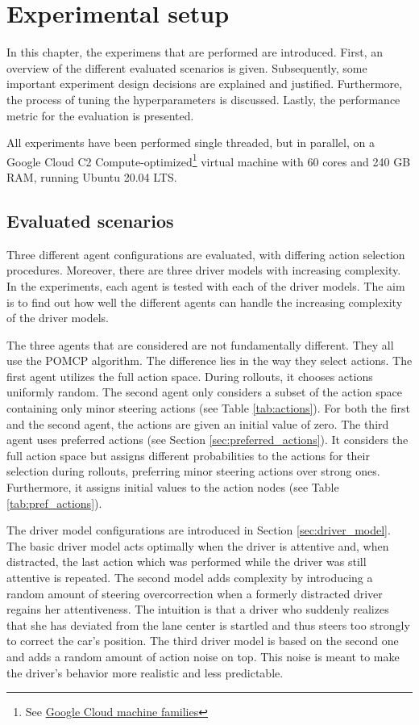 \chapter{Experimental setup}
\label{sec:setup}

In this chapter, the experimens that are performed are introduced. First, an overview of the different evaluated scenarios is given. Subsequently, some important experiment design decisions are explained and justified. Furthermore, the process of tuning the hyperparameters is discussed. Lastly, the performance metric for the evaluation is presented.

All experiments have been performed single threaded, but in parallel, on a Google Cloud C2 Compute-optimized\footnote{See \href{https://cloud.google.com/compute/docs/machine-types}{Google Cloud machine families}} virtual machine with 60 cores and 240 GB RAM, running Ubuntu 20.04 LTS.



\section{Evaluated scenarios}

Three different agent configurations are evaluated, with differing action selection procedures. Moreover, there are three driver models with increasing complexity. In the experiments, each agent is tested with each of the driver models. The aim is to find out how well the different agents can handle the increasing complexity of the driver models.

The three agents that are considered are not fundamentally different. They all use the POMCP algorithm. The difference lies in the way they select actions. The first agent utilizes the full action space. During rollouts, it chooses actions uniformly random. The second agent only considers a subset of the action space containing only minor steering actions (see Table \ref{tab:actions}). For both the first and the second agent, the actions are given an initial value of zero. The third agent uses preferred actions (see Section \ref{sec:preferred_actions}). It considers the full action space but assigns different probabilities to the actions for their selection during rollouts, preferring minor steering actions over strong ones. Furthermore, it assigns initial values to the action nodes (see Table \ref{tab:pref_actions}).

The driver model configurations are introduced in Section \ref{sec:driver_model}. The basic driver model acts optimally when the driver is attentive and, when distracted, the last action which was performed while the driver was still attentive is repeated. The second model adds complexity by introducing a random amount of steering overcorrection when a formerly distracted driver regains her attentiveness. The intuition is that  a driver who suddenly realizes that she has deviated from the lane center is startled and thus steers too strongly to correct the car's position. The third driver model is based on the second one and adds a random amount of action noise on top. This noise is meant to make the driver's behavior more realistic and less predictable.

